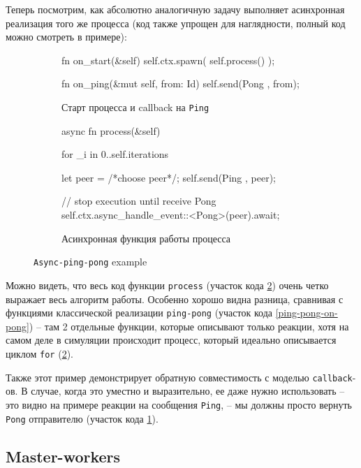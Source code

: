 Теперь посмотрим, как абсолютно аналогичную задачу выполняет асинхронная реализация того же процесса (код также упрощен для наглядности, полный код можно смотреть в примере\cite{async-ping-pong-example}): 

\begin{figure}[H]
    \centering
    \begin{subfigure}[b]{0.45\linewidth}
        \footnotesize
        \centering
        \begin{rustcode}
fn on_start(&self) {
  self.ctx.spawn(
    self.process()
  );
}

fn on_ping(&mut self, from: Id) {
  self.send(Pong {}, from);
}    
    \end{rustcode}
        \caption{Старт процесса и callback на \texttt{Ping}}
        \label{start-async-ping-pong}
    \end{subfigure}
    \hfill
    \begin{subfigure}[b]{0.54\linewidth}
        \footnotesize
        \centering
        \begin{rustcode}
async fn process(&self) {
  for _i in 0..self.iterations {
    let peer = /*choose peer*/;
    self.send(Ping {}, peer);

    // stop execution until receive Pong
    self.ctx.async_handle_event::<Pong>(peer).await;
  }
}
    \end{rustcode}
    \caption{Асинхронная функция работы процесса}
    \label{async-ping-pong-action}
\end{subfigure}
\caption{\texttt{Async-ping-pong} example}
\label{async-ping-pong-code}
\end{figure}

Можно видеть, что весь код функции \texttt{process} (участок кода \ref{async-ping-pong-action}) очень четко выражает весь алгоритм работы. Особенно хорошо видна разница, сравнивая с функциями классической реализации \texttt{ping-pong} (участок кода \ref{ping-pong-on-pong}) -- там 2 отдельные функции, которые описывают только реакции, хотя на самом деле в симуляции происходит процесс, который идеально описывается циклом \texttt{for} (\ref{async-ping-pong-action}). 

Также этот пример демонстрирует обратную совместимость с моделью \texttt{callback}-ов. В случае, когда это уместно и выразительно, ее даже нужно использовать -- это видно на примере реакции на сообщения \texttt{Ping}, -- мы должны просто вернуть \texttt{Pong} отправителю (участок кода \ref{start-async-ping-pong}). 

\subsection{Master-workers}\label{master-workers-subsection}

